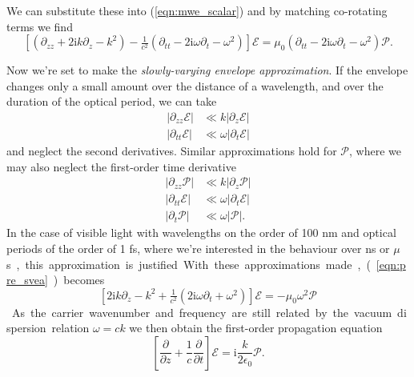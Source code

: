     We can substitute these into (\ref{eqn:mwe_scalar}) and by matching
    co-rotating terms we find
    \begin{equation}
    \left[ ( \partial_{zz} + 2 \mathrm{i} k \partial_{z} - k^2 ) - 
      \tfrac{1}{c^2} (\partial_{tt} - 
      2 \mathrm{i} \omega \partial_{t} - \omega^2 ) \right] \mathcal{E} = 
      \mu_0 (\partial_{tt} - 2 \mathrm{i} \omega \partial_{t} - 
      \omega^2) \mathcal{P}.
    \label{eqn:pre_svea}
    \end{equation}

    Now we're set to make the \textit{slowly-varying envelope
    approximation}.\cite{lambropoulos2007fundamentals} If the envelope changes
    only a small amount over the distance of a wavelength, and over the duration
    of the optical period, we can take
    \begin{align*}
    \lvert \partial_{zz} \mathcal{E} \rvert &\ll k \lvert \partial_{z} 
        \mathcal{E} \rvert\\
    \lvert \partial_{tt} \mathcal{E} \rvert &\ll \omega \lvert \partial_{t} 
        \mathcal{E} \rvert
    \end{align*}
    and neglect the second derivatives. Similar approximations hold for
    $\mathcal{P}$, where we may also neglect the first-order time derivative
    \begin{align*}
      \lvert \partial_{zz} \mathcal{P} \rvert &\ll 
        k \lvert \partial_{z} \mathcal{P} \rvert \\
      \lvert \partial_{tt} \mathcal{E} \rvert &\ll 
        \omega \lvert \partial_{t} \mathcal{E} \rvert \\
      \lvert \partial_{t} \mathcal{P} \rvert &\ll 
        \omega \lvert \mathcal{P} \rvert.
    \end{align*}
    In the case of visible light with wavelengths on the order of 100 nm and
    optical periods of the order of 1 fs, where we're interested in the
    behaviour over \unit{ns} or \unit{$\mu$s}, this approximation is justified.

    With these approximations made, (\ref{eqn:pre_svea}) becomes
    \begin{equation}
      \left[ 2 \mathrm{i} k \partial_z - k^2 + \tfrac{1}{c^2} 
      (2 \mathrm{i} \omega \partial_t + \omega^2 ) \right] \mathcal{E} = 
      -\mu_0 \omega^2 \mathcal{P}
    \end{equation}
    As the carrier wavenumber and frequency are still related by the vacuum
    dispersion relation $\omega = c k$ we then obtain the first-order
    propagation equation
    \begin{equation}
      \label{eqn:fo_mwe}
      \left[ \frac{\partial}{\partial z} + \frac{1}{c} 
      \frac{\partial}{\partial t} \right] \mathcal{E} = 
      \mathrm{i} \frac{k}{2 \epsilon_0} \mathcal{P}.
    \end{equation}


